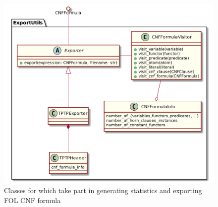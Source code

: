 \begin{figure}[h]
\begin{centering}
  \includegraphics[width=\textwidth]{logic-formula-generator/fol/cnf_formula_statistics.png}
  \caption{Classes for which take part in generating statistics and exporting FOL CNF formula}
  \label{pic:FormulaExportUtils}
\end{centering}
\end{figure}
